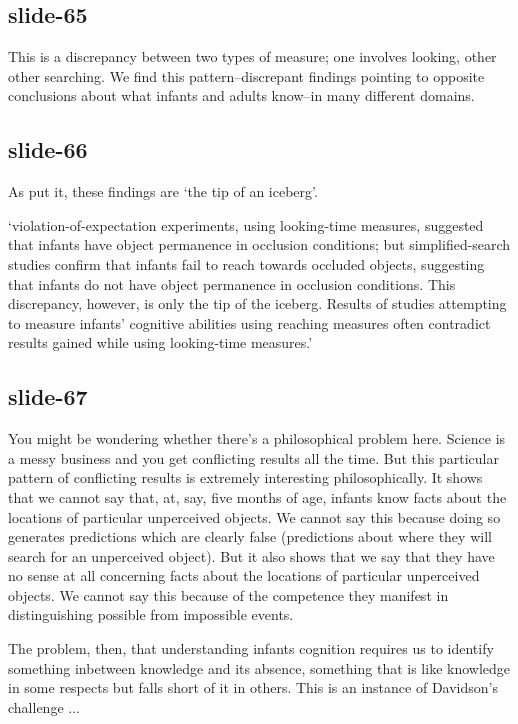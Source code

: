 \documentclass[12pt,\papersize]{extarticle}
\begin{document}
 
 
\subsection{slide-65}
This is a discrepancy between two types of measure; one involves looking, other other searching. We find this pattern--discrepant findings pointing to opposite conclusions about what infants and adults know--in many different domains.
 
 
 
\subsection{slide-66}
As \citet[p.\ 994]{charles:2009_object} put it, these findings are ‘the tip of an iceberg’.
 
‘violation-of-expectation experiments, using looking-time measures, suggested that infants have object permanence in occlusion conditions; but simplified-search studies confirm that infants fail to reach towards occluded objects, suggesting that infants do not have object permanence in occlusion conditions. This discrepancy, however, is only the tip of the iceberg. Results of studies attempting to measure infants’ cognitive abilities using reaching measures often contradict results gained while using looking-time measures.’ \citep[p.\ 994]{charles:2009_object}
 
 
 
\subsection{slide-67}
You might be wondering whether there's a philosophical problem here. Science is a messy business and you get conflicting results all the time. But this particular pattern of conflicting results is extremely interesting philosophically. It shows that we cannot say that, at, say, five months of age, infants know facts about the locations of particular unperceived objects. We cannot say this because doing so generates predictions which are clearly false (predictions about where they will search for an unperceived object). But it also shows that we say that they have no sense at all concerning facts about the locations of particular unperceived objects. We cannot say this because of the competence they manifest in distinguishing possible from impossible events.
 
The problem, then, that understanding infants cognition requires us to identify something inbetween knowledge and its absence, something that is like knowledge in some respects but falls short of it in others. This is an instance of Davidson's challenge ...
 
\end{document}

